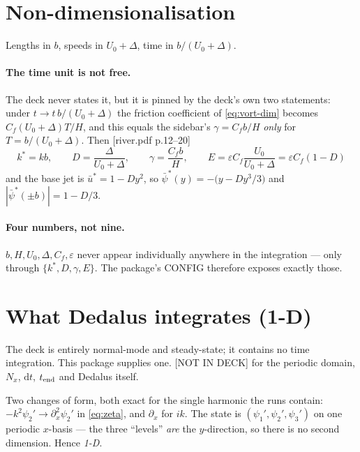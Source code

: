 \documentclass[11pt]{article}
\newcommand{\deck}[1]{{\color{blue!45!black}\small[river.pdf p.#1]}}
\newcommand{\notdeck}{{\color{red!55!black}\small[NOT IN DECK]}}
\newcommand{\pt}{\psi_2'}
\newcommand{\po}{\psi_1'}
\newcommand{\ph}{\psi_3'}
\newcommand{\ks}{k^{*}}
\newcommand{\dx}{\partial_x}
\begin{document}
\section{Non-dimensionalisation}
\label{sec:nondim}

Lengths in $b$, speeds in $U_0+\Delta$, time in $b/(U_0+\Delta)$.

\paragraph{The time unit is not free.} The deck never states it, but it is pinned by the
deck's own two statements: under $t\to t\,b/(U_0+\Delta)$ the friction coefficient of
\eqref{eq:vort-dim} becomes $C_f(U_0+\Delta)T/H$, and this equals the sidebar's
$\gamma=C_f b/H$ \emph{only} for $T=b/(U_0+\Delta)$. Then \deck{12--20}
\begin{equation}
  \boxed{\;\ks=kb,\qquad D=\frac{\Delta}{U_0+\Delta},\qquad \gamma=\frac{C_f b}{H},
  \qquad E=\varepsilon C_f\frac{U_0}{U_0+\Delta}=\varepsilon C_f(1-D)\;}
\end{equation}
and the base jet is $\bar u^{*}=1-Dy^{2}$, so
$\bar\psi^{*}(y)=-\bigl(y-Dy^{3}/3\bigr)$ and $|\bar\psi^{*}(\pm b)|=1-D/3$.

\paragraph{Four numbers, not nine.} $b,H,U_0,\Delta,C_f,\varepsilon$ never appear
individually anywhere in the integration --- only through $\{\ks,D,\gamma,E\}$. The
package's CONFIG therefore exposes exactly those.

\section{What Dedalus integrates (1-D)}

The deck is entirely normal-mode and steady-state; it contains no time integration. This
package supplies one. \notdeck{} for the periodic domain, $N_x$, $\mathrm dt$, $t_{\rm end}$
and Dedalus itself.

Two changes of form, both exact for the single harmonic the runs contain:
$-k^{2}\pt\to\dx^{2}\pt$ in \eqref{eq:zeta}, and $\dx$ for $ik$. The state is
$(\po,\pt,\ph)$ on one periodic $x$-basis --- the three ``levels'' \emph{are} the
$y$-direction, so there is no second dimension. Hence \emph{1-D}.
\end{document}
